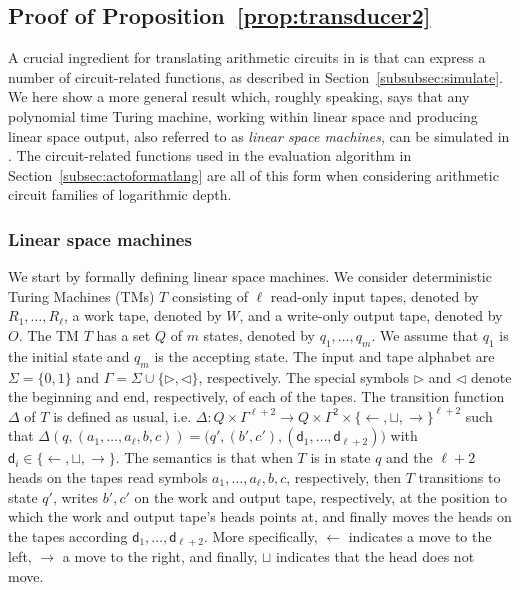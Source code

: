 \subsection{Proof of Proposition~\ref{prop:transducer2}}
A crucial ingredient for translating arithmetic circuits in \langfor is that \langfor
can express a number of circuit-related functions, as described in Section~\ref{subsubsec:simulate}.
We here show a more general result which, roughly speaking, says that any 
polynomial time Turing machine, working within linear space and producing linear space output, also
referred to as \textit{linear space machines}, 
can be simulated in \langfor. The circuit-related functions used in the evaluation algorithm in Section~\ref{subsec:actoformatlang}
are all of this form when considering arithmetic circuit families of logarithmic depth.

\subsubsection{Linear space machines}\label{subsubsec:linearspace}
We start by formally defining linear space machines. We consider  deterministic Turing Machines (TMs) $T$ 
consisting of $\ell$ read-only input tapes, denoted by $R_1,\ldots,R_\ell$,
a work tape, denoted by $W$, and a write-only output tape, denoted by $O$. The TM $T$ has a set 
$Q$ of $m$ states, denoted by $q_1,\ldots,q_m$. We assume that $q_1$ is the initial state and $q_m$ is the accepting state.
The input and tape alphabet are $\Sigma=\{0,1\}$ and $\Gamma=\Sigma\cup\{\rhd,\lhd\}$, respectively. The special 
symbols $\rhd$ and $\lhd$ denote the beginning and end, respectively, of each of the tapes.
The transition function $\Delta$ of $T$ is defined as usual, i.e. 
$\Delta:Q\times \Gamma^{\ell+2} \to Q\times \Gamma^{2}\times \{\leftarrow,\sqcup,\rightarrow\}^{\ell+2}$ 
such that $\Delta(q,(a_1,\ldots,a_{\ell},b,c))=\bigl(q',(b',c'),(\mathsf{d}_1,\ldots,\mathsf{d}_{\ell+2})\bigr)$
with $\mathsf{d}_i\in \{\leftarrow,\sqcup,\rightarrow\}$. The semantics is that when $T$ is in state $q$ and the $\ell+2$ 
heads on the tapes read symbols $a_1,\ldots,a_{\ell},b,c$, respectively, then $T$ transitions to state $q'$,
writes $b',c'$ on the work and output tape, respectively, at the position to which the work and output 
tape's heads points at, and finally moves the heads on the tapes according 
$\mathsf{d}_1,\ldots,\mathsf{d}_{\ell+2}$. More specifically, $\leftarrow$  indicates a move to the left, 
$\rightarrow$ a move to the right, and finally, $\sqcup$ indicates that the head does not move.

